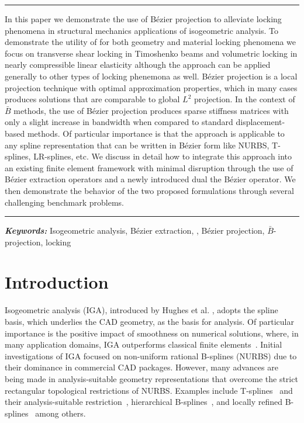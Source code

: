 \documentclass{article}
\newcommand{\Bezier}{{B\'{e}zier} }
\renewenvironment{abstract}{%
\hfill\begin{minipage}{0.95\textwidth}
\rule{\textwidth}{1pt}}
{\par\noindent\rule{\textwidth}{1pt}\end{minipage}}
\providecommand{\keywords}[1]{\textbf{\textit{Keywords: }}#1}
\begin{document}
\begin{abstract}
  In this paper we demonstrate the use of B\'{e}zier projection to alleviate locking phenomena in structural mechanics applications of isogeometric analysis.  To demonstrate the utility of \added{\Bezier projection} for both geometry and material locking phenomena we focus on transverse shear locking in Timoshenko beams and volumetric locking in nearly compressible linear elasticity although the approach can be applied generally to other types of locking phenemona as well. B\'{e}zier projection is a local projection technique with optimal approximation properties, which in many cases produces solutions that are comparable to global $L^2$ projection. In the context of $\bar{B}$ methods, the use of B\'ezier projection produces sparse stiffness matrices with only a slight increase in bandwidth when compared to standard displacement-based methods. Of particular importance is that the approach is applicable to any spline representation that can be written in B\'ezier form like NURBS, T-splines, LR-splines, etc. We discuss in detail how to integrate this approach into an existing finite element framework with minimal disruption through the use of B\'ezier extraction operators and a newly introduced dual  the \Bezier {} operator. We then demonstrate the behavior of the two proposed formulations through several challenging benchmark problems.
\end{abstract}
\keywords{Isogeometric analysis, B\'ezier extraction, \added{\Bezier dual basis}, B\'ezier projection, $\bar{B}$-projection, locking}
\section{Introduction}
Isogeometric analysis (IGA), introduced by Hughes et al. \cite{hughes_isogeometric_2005}, adopts the spline basis, which underlies the CAD geometry, as the basis for analysis. Of particular importance is the positive impact of smoothness on numerical solutions, where, in many application domains, IGA outperforms classical finite elements~\cite{cottrell_isogeometric_2009,cottrell_studies_2007,cottrell2006isogeometric,hughes_duality_2008,bazilevs_isogeometric_2010,evans_n-widths_2009}. Initial investigations of IGA focused on non-uniform rational B-splines (NURBS) due to their dominance in commercial CAD packages. However, many advances are being made in analysis-suitable geometry representations that overcome the strict rectangular topological restrictions of NURBS. Examples include T-splines~\cite{bazilevs_isogeometric_2010,sederberg_t-splines_2003} and their analysis-suitable restriction~\cite{scott_local_2012, li_analysis-suitable_2013}, hierarchical B-splines~\cite{bornemann_subdivision-based_2013,scott_isogeometric_2014,schillinger_isogeometric_2012,evans_hierarchical_2015,forsey_hierarchical_1988}, and locally refined B-splines~\cite{dokken_polynomial_2013,johannessen_isogeometric_2014} among others.
\end{document}
